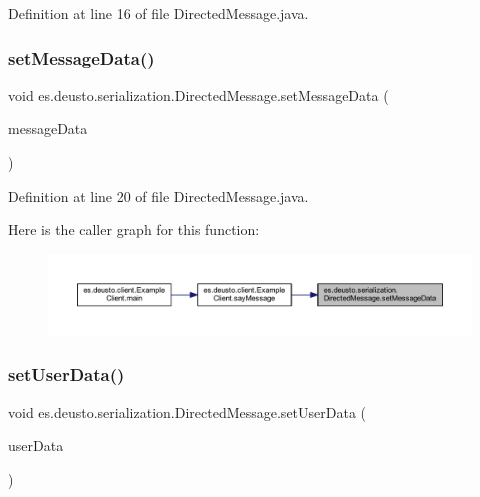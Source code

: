 Definition at line 16 of file Directed\+Message.\+java.

\mbox{\label{classes_1_1deusto_1_1serialization_1_1_directed_message_a07d4d35baf35f14f68f710e34a564f8d}} 
\subsubsection{\texorpdfstring{setMessageData()}{setMessageData()}}
{\footnotesize\ttfamily void es.\+deusto.\+serialization.\+Directed\+Message.\+set\+Message\+Data (\begin{DoxyParamCaption}\item[{\mbox{\hyperlink{classes_1_1deusto_1_1serialization_1_1_message_data}{Message\+Data}}}]{message\+Data }\end{DoxyParamCaption})}



Definition at line 20 of file Directed\+Message.\+java.

Here is the caller graph for this function\+:
\nopagebreak
\begin{figure}[H]
\begin{center}
\leavevmode
\includegraphics[width=350pt]{classes_1_1deusto_1_1serialization_1_1_directed_message_a07d4d35baf35f14f68f710e34a564f8d_icgraph}
\end{center}
\end{figure}
\mbox{\label{classes_1_1deusto_1_1serialization_1_1_directed_message_a4a3f7852410bc29d73179294836e84c4}} 
\subsubsection{\texorpdfstring{setUserData()}{setUserData()}}
{\footnotesize\ttfamily void es.\+deusto.\+serialization.\+Directed\+Message.\+set\+User\+Data (\begin{DoxyParamCaption}\item[{\mbox{\hyperlink{classes_1_1deusto_1_1serialization_1_1_user_data}{User\+Data}}}]{user\+Data }\end{DoxyParamCaption})}



